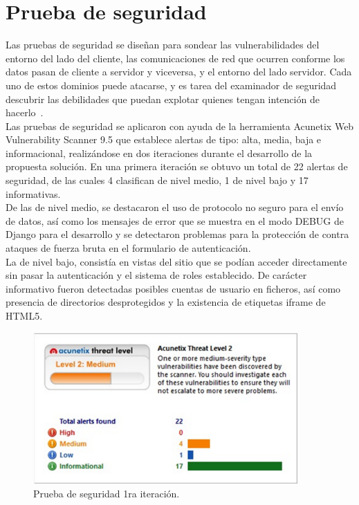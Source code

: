 \section{Prueba de seguridad}

Las pruebas de seguridad se diseñan para sondear las vulnerabilidades del entorno del lado del cliente, las
comunicaciones de red que ocurren conforme los datos pasan de cliente a servidor y viceversa, y el entorno
del lado servidor. Cada uno de estos dominios puede atacarse, y es tarea del examinador de seguridad
descubrir las debilidades que puedan explotar quienes tengan intención de hacerlo~\cite{pressman2010practitioner}.\\
Las pruebas de seguridad se aplicaron con ayuda de la herramienta Acunetix Web Vulnerability Scanner 9.5
que establece alertas de tipo: alta, media, baja e informacional, realizándose en dos iteraciones durante el
desarrollo de la propuesta solución.
En una primera iteración se obtuvo un total de 22 alertas de seguridad, de las cuales 4 clasifican de nivel
medio, 1 de nivel bajo y 17 informativas.\\
De las de nivel medio, se destacaron el uso de protocolo no seguro
para el envío de datos, así como los mensajes de error que se muestra en el modo DEBUG de Django para
el desarrollo y se detectaron problemas para la protección de contra ataques de fuerza bruta en el formulario
de autenticación.\\
La de nivel bajo, consistía en vistas del sitio que se podían acceder directamente sin pasar la autenticación
y el sistema de roles establecido. De carácter informativo fueron detectadas posibles cuentas de usuario en ficheros, así como presencia de directorios desprotegidos y la existencia de etiquetas iframe de HTML5.

\begin{figure}[htbp] %
	\centering
	\includegraphics[width=0.9\textwidth]{images/primeraIt.PNG} 
	\caption{ Prueba de seguridad 1ra iteración.}
	\label{fig:grafica_segur}
\end{figure}

